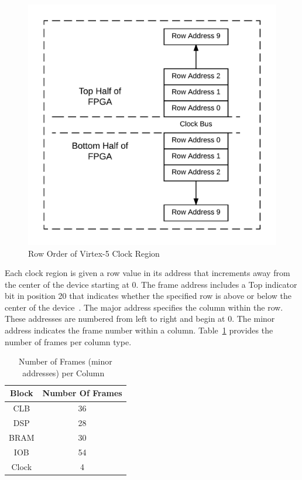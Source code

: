 \documentclass[conference]{IEEEtran}
\begin{document}
\begin{figure}[h]
	\centering
	\includegraphics[width=.7\linewidth]{../Thesis/Figures/RowOrder}
	\caption[Row Order of Virtex-5 Clock Region]{Row Order of Virtex-5 Clock Region}
	\label{fig:RowOrder}
\end{figure}
Each clock region is given a row value in its address that increments away from the center of the device starting at 0. 
The frame address includes a Top indicator bit in position 20 that indicates whether the specified row is above or below the center of the device~\cite{virtex5ConfigGuide}.
The major address specifies the column within the row.
These addresses are numbered from left to right and begin at 0.
The minor address indicates the frame number within a column. 
Table~\ref{tbl:minorAddressNumbers} provides the number of frames per column type.
\begin{table}[h!]
	\centering
	\caption{Number of Frames (minor addresses) per Column~\cite{virtex5ConfigGuide}}
	\label{tbl:minorAddressNumbers}
	\begin{tabular}{|c|c|}
		\hline
		Block             & Number Of Frames \\ \hline
		CLB               & 36               \\ \hline
		DSP               & 28               \\ \hline
		\acrshort{BRAM}   & 30               \\ \hline
		IOB               & 54               \\ \hline
		Clock             & 4                \\ \hline
	\end{tabular}
\end{table}
\end{document}
